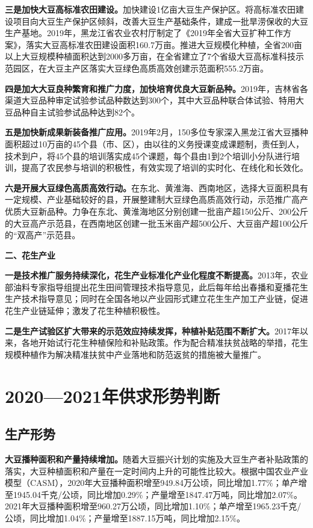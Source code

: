 \documentclass{progbookcn}
\begin{document}
\textbf{三是加快大豆高标准农田建设。}加快建设1亿亩大豆生产保护区。将高标准农田建设项目向大豆生产保护区倾斜，改善大豆生产基础条件，建成一批旱涝保收的大豆生产基地。2019年，黑龙江省农业农村厅制定了《2019年全省大豆扩种工作方案》，落实大豆高标准农田建设面积160.7万亩。推进大豆规模化种植，全省200亩以上大豆规模种植面积达到2000多万亩，在全省建立了7个省级大豆高标准科技示范园区，在大豆主产区落实大豆绿色高质高效创建示范面积555.2万亩。

\textbf{四是加大大豆良种繁育和推广力度，加快培育优良大豆新品种。}2019年，吉林省各渠道大豆品种审定试验参试品种数达到300个，其中大豆品种联合体试验、特用大豆品种自主试验参试品种达到82个。

\textbf{五是加快新成果新装备推广应用。}2019年2月，150多位专家深入黑龙江省大豆播种面积超过10万亩的45个县（市、区），由以往的义务授课变成课题制，责任到人，技术到户，将45个县的培训落实成45个课题，每个县由1到2个培训小分队进行培训，提高了农民参与培训的积极性，有效实现了培训的实时化、在线化和长效化。

\textbf{六是开展大豆绿色高质高效行动。}在东北、黄淮海、西南地区，选择大豆面积具有一定规模、产业基础较好的县，开展整建制大豆绿色高质高效行动，示范推广高产优质大豆新品种。力争在东北、黄淮海地区分别创建一批亩产超150公斤、200公斤的大豆高产示范县，在西南地区创建一批玉米亩产超500公斤、大豆亩产超100公斤的“双高产”示范县。

\textbf{二、花生产业}

\textbf{一是技术推广服务持续深化，花生产业标准化产业化程度不断提高。}2013年，农业部油料专家指导组提出花生田间管理技术指导意见，此后每年给出春播和夏播花生生产技术指导意见；同时在全国各地以产业园形式建立花生生产加工产业链，促进花生产业链延伸；激发了花生种植积极性。

\textbf{二是生产试验区扩大带来的示范效应持续发挥，种植补贴范围不断扩大。}2017年以来，各地开始试行花生种植保险和补贴政策。作为配合精准扶贫战略的举措，花生规模种植作为解决精准扶贫中产业落地和防范返贫的措施被大量推广。

\section{2020—2021年供求形势判断}
\subsection{生产形势}

\textbf{大豆播种面积和产量持续增加。}随着大豆振兴计划的实施及大豆生产者补贴政策的落实，大豆种植面积和产量在一定时间内上升的可能性比较大。根据中国农业产业模型（CASM），2020年大豆播种面积增至949.84万公顷，同比增加1.77\%；单产增至1945.04千克/公顷，同比增加0.29\%；产量增至1847.47万吨，同比增加2.07\%。2021年大豆播种面积增至960.27万公顷，同比增加1.10\%；单产增至1965.23千克/公顷，同比增加1.04\%；产量增至1887.15万吨，同比增加2.15\%。
\end{document}
